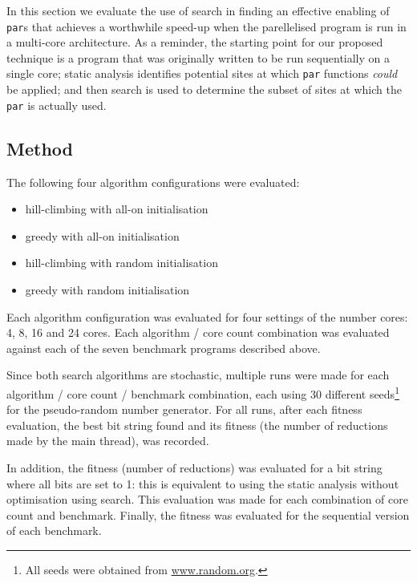 In this section we evaluate the use of search in finding an effective enabling
of \verb-par-s that achieves a worthwhile speed-up when the parellelised
program is run in a multi-core architecture.  As a reminder, the starting point
for our proposed technique is a program that was originally written to be run
sequentially on a single core; static analysis identifies potential sites at
which \verb-par- functions \emph{could} be applied; and then search is used to
determine the subset of sites at which the \verb-par- is actually used.


\subsection{Method}

The following four algorithm configurations were evaluated:
\begin{itemize}
	\item hill-climbing with all-on initialisation
	\item greedy with all-on initialisation
	\item hill-climbing with random initialisation
	\item greedy with random initialisation
\end{itemize}

Each algorithm configuration was evaluated for four settings of the number
cores: 4, 8, 16 and 24 cores. Each algorithm / core count combination was
evaluated against each of the seven benchmark programs described above.

Since both search algorithms are stochastic, multiple runs were made for each
algorithm / core count / benchmark combination, each using 30 different
seeds\footnote{All seeds were obtained from \url{www.random.org}.} for the
pseudo-random number generator.  For all runs, after each fitness evaluation,
the best bit string found and its fitness (the number of reductions made by the
main thread), was recorded.

In addition, the fitness (number of reductions) was evaluated for a bit string
where all bits are set to 1: this is equivalent to using the static analysis
without optimisation using search.  This evaluation was made for each
combination of core count and benchmark.  Finally, the fitness was evaluated for the
sequential version of each benchmark.

